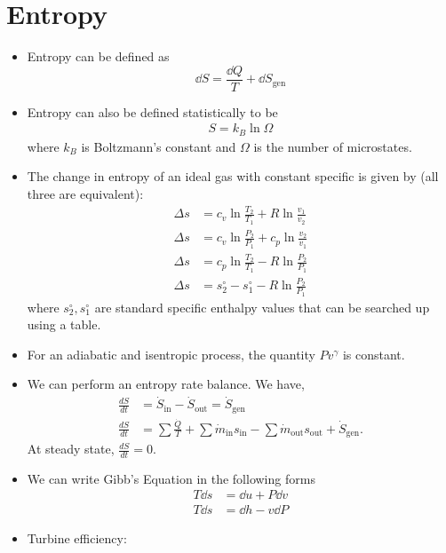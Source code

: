 \documentclass{article}
\begin{document}
\section{Entropy}
\begin{itemize}
    \item Entropy can be defined as 
    \begin{equation}
        \dd{S} = \frac{\dd{Q}}{T} + \dd{S}_\text{gen}
    \end{equation}
    \item Entropy can also be defined statistically to be 
    \begin{eqnarray}
        S = k_B \ln \Omega 
    \end{eqnarray}
    where $k_B$ is Boltzmann's constant and $\Omega$ is the number of microstates.
    \item The change in entropy of an ideal gas with constant specific is given by (all three are equivalent): 
    \begin{align}
        \Delta s &= c_v\ln\frac{T_2}{T_1} +R\ln \frac{v_1}{v_2} \\ 
        \Delta s &= c_v \ln\frac{P_2}{P_1} + c_p\ln\frac{v_2}{v_1} \\ 
        \Delta s &= c_p \ln\frac{T_2}{T_1} - R\ln\frac{P_2}{P_1} \\
        \Delta s &= s_2^\circ - s_1^\circ - R\ln\frac{P_2}{P_1}
    \end{align}
    where $s_2^\circ,s_1^\circ$ are standard specific enthalpy values that can be searched up using a table.
    \item For an adiabatic and isentropic process, the quantity $Pv^\gamma$ is constant.
    \item We can perform an entropy rate balance. We have, 
    \begin{align}
        \frac{dS}{dt} &= \dot{S}_\text{in} - \dot{S}_\text{out} = \dot{S}_\text{gen} \\ 
        \frac{dS}{dt} &= \sum \frac{\dot{Q}}{T} + \sum \dot{m}_\text{in}s_\text{in} - \sum \dot{m}_\text{out}s_\text{out} + \dot{S}_\text{gen}.
    \end{align}
    At steady state, $\frac{dS}{dt} =0 $.
    \item We can write Gibb's Equation in the following forms 
    \begin{align}
        T\dd{s}&=\dd{u} + P\dd{v} \\ 
        T\dd{s}&=\dd{h} - v\dd{P}
    \end{align}
    \item Turbine efficiency: 

\end{itemize}
\end{document}
